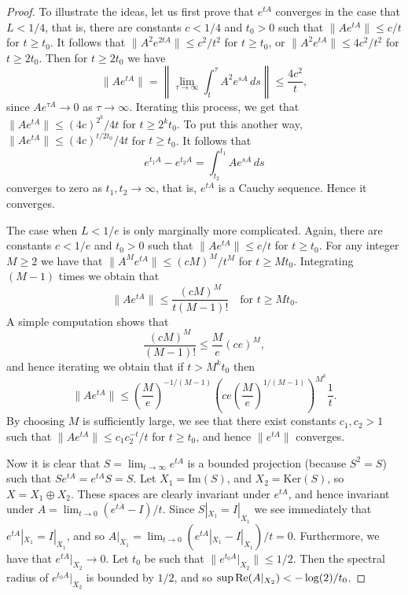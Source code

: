 \documentclass[12pt]{amsart}
\newcommand{\normo}[1]{{\left\|#1\right\|}}
\newcommand{\snormo}[1]{{\mathopen\|#1\mathclose\|}}
\begin{document}
\begin{proof}%
To illustrate the ideas, let us first prove that $e^{tA}$ converges
in the case that
$L < 1/4$, that is,
there are constants $c<1/4$ and $t_0>0$ such
that $\snormo{A e^{tA}} \le c/t$ for $t\ge t_0$.
It follows that $\snormo{A^2 e^{2tA}} \le c^2/t^2$ for $t \ge t_0$, or
$\snormo{A^2 e^{tA}} \le 4c^2/t^2$ for $t \ge 2t_0$.  Then for $t \ge 2t_0$
we have
$$ \snormo{A e^{tA}}
   =
   \normo{\lim_{\tau\to\infty} \int_t^\tau A^2 e^{sA} \, ds}
   \le \frac{4c^2}t, $$
since ${A e^{\tau A}} \to 0$ as $\tau \to \infty$.
Iterating this process,
we get that
$\snormo{A e^{tA}} \le (4c)^{2^k}/4t$ for $t\ge 2^k t_0$.  To put this
another way, $\snormo{A e^{tA}} \le (4c)^{t/2t_0}/4t$ for $t \ge t_0$.
It follows that
$$ e^{t_1A} - e^{t_2A} = \int_{t_2}^{t_1} A e^{sA} \, ds $$
converges to zero as $t_1,t_2 \to \infty$,
that is, $e^{tA}$ is a Cauchy sequence.  Hence it
converges.

The case when $L<1/e$ is only marginally more complicated.
Again,
there are constants $c<1/e$ and $t_0>0$ such that
$\snormo{A e^{tA}} \le c/t$ for $t\ge t_0$.
For any integer $M \ge 2$ we have
that $\snormo{A^M e^{tA}} \le (cM)^M/t^M$ for $t \ge Mt_0$.
Integrating $(M-1)$ times we obtain that
$$ \snormo{A e^{tA}} \le \frac{(cM)^M}{t(M-1)!}  \quad \text{for $t\ge Mt_0$}.$$
A simple computation shows that
$$ \frac{(cM)^M}{(M-1)!} \le \frac Me (ce)^M ,$$
and hence iterating we obtain that if $t>M^k t_0$ then
$$ \snormo{A e^{tA}} \le
   \left(\frac Me\right)^{-1/(M-1)}
   \left( ce \left(\frac Me\right)^{1/(M-1)} \right)^{M^k} \frac 1t.$$
By choosing $M$ is sufficiently large, we see that
there exist constants $c_1,c_2>1$ such that
$\snormo{A e^{tA}} \le c_1 c_2^{-t}/t$ for $t \ge t_0$,
and hence
$\snormo{e^{tA}}$ converges.

Now it is clear that $S=\lim_{t \to \infty} e^{tA}$ is a
bounded projection (because $S^{2}=S$) such that $Se^{tA}=e^{tA}S=S$.
Let $X_1 = \text{Im}(S)$, and $X_2 = \text{Ker}(S)$, so
$X = X_1 \oplus X_2$.  These spaces are
clearly invariant under $e^{tA}$, and hence
invariant under $A = \lim_{t\to0}(e^{tA}-I)/t$.
Since
$S|_{X_1} = I|_{X_1}$ we see immediately that $e^{tA}|_{X_1} = I|_{X_1}$,
and so $A|_{X_1} = \lim_{t\to0}(e^{tA}|_{X_1}-I|_{X_1})/t = 0$.
Furthermore, we have that $e^{tA}|_{X_2} \to 0$.  Let $t_0$ be such that
$\snormo{e^{t_0 A}|_{X_2}} \le 1/2$.  Then the spectral radius of
$e^{t_0 A}|_{X_2}$ is bounded by $1/2$, and so
$\sup\text{\rm Re}(A|_{X_2}) < -\log(2)/t_0$.
\end{proof}
\end{document}
